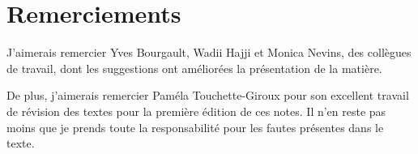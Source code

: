 \section*{Remerciements}

J'aimerais remercier Yves Bourgault, Wadii Hajji et Monica Nevins,
des collègues de travail, dont les suggestions ont améliorées la
présentation de la matière.

De plus, j'aimerais remercier Paméla Touchette-Giroux pour son
excellent travail de révision des textes pour la première édition de
ces notes.  Il n'en reste pas moins que je prends toute la
responsabilité pour les fautes présentes dans le texte.

